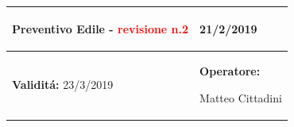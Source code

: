 \documentclass[a4paper]{article}
\begin{document}
                                  \begin{center}
                                  \begin{tabular}{|L{89mm} R{60mm}| }
                                  \hline
                                  \vspace{2.5mm}
                                  \begin{spacing}{0}
                                \textbf{Preventivo Edile - } \textcolor{red}{revisione n.2}
                                  \end{spacing}&
                                  \vspace{2.5mm}
                                  \begin{spacing}{0}

                                21/2/2019

                                  \end{spacing}\\
                                  \hline
                                  \vspace{2.5mm}
                                  \begin{spacing}{0}

                                
                                        \textbf{Validit\'a:}
                                   23/3/2019
                                  \end{spacing} &
                                  \vspace{2.5mm}
                                  \begin{spacing}{0}
                                    \textbf{Operatore:}

                               Matteo Cittadini
                                  \end{spacing} \\
                                  \hline
                                  \end{tabular}
                                  \end{center}
                               
\end{document}
